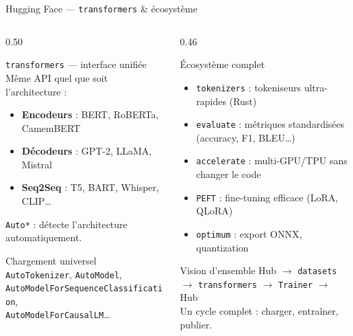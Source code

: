 \documentclass[aspectratio=169, 10pt]{beamer}
\begin{document}
\begin{frame}{Hugging Face --- \texttt{transformers} \& écosystème}
  \begin{columns}[T]
    \begin{column}{0.50\textwidth}
      \begin{block}{\texttt{transformers} --- interface unifiée}
        Même API quel que soit l'architecture :
        \begin{itemize}
          \item \textbf{Encodeurs} : BERT, RoBERTa, CamemBERT
          \item \textbf{Décodeurs} : GPT-2, LLaMA, Mistral
          \item \textbf{Seq2Seq} : T5, BART, Whisper, CLIP\ldots
        \end{itemize}
        \vspace{4pt}
        \texttt{Auto*} : détecte l'architecture automatiquement.
      \end{block}
      \smallskip
      \begin{exampleblock}{Chargement universel}
        \texttt{AutoTokenizer}, \texttt{AutoModel},\\
        \texttt{AutoModelForSequenceClassification},\\
        \texttt{AutoModelForCausalLM}\ldots
      \end{exampleblock}
    \end{column}
    \begin{column}{0.46\textwidth}
      \begin{alertblock}{Écosystème complet}
        \begin{itemize}
          \item \texttt{tokenizers} : tokeniseurs ultra-rapides (Rust)
          \item \texttt{evaluate} : métriques standardisées
                (accuracy, F1, BLEU\ldots)
          \item \texttt{accelerate} : multi-GPU/TPU sans changer le code
          \item \texttt{PEFT} : fine-tuning efficace (LoRA, QLoRA)
          \item \texttt{optimum} : export ONNX, quantization
        \end{itemize}
      \end{alertblock}
      \smallskip
      \begin{block}{Vision d'ensemble}
        Hub $\to$ \texttt{datasets} $\to$ \texttt{transformers}
        $\to$ \texttt{Trainer} $\to$ Hub\\[2pt]
        Un cycle complet : charger, entraîner, publier.
      \end{block}
    \end{column}
  \end{columns}
\end{frame}
\end{document}
